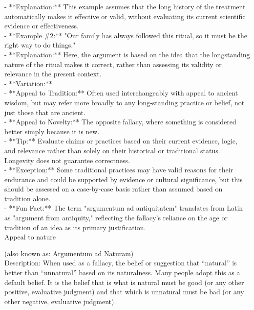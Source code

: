 \documentclass[a4paper,12pt,single,pdftex]{scrartcl}
\begin{document}
    
      - **Explanation:** This example assumes that the long history of the treatment automatically makes it effective or valid, without evaluating its current scientific evidence or effectiveness.
    \\

    
      - **Example \#2:** "Our family has always followed this ritual, so it must be the right way to do things."
    \\

    
      - **Explanation:** Here, the argument is based on the idea that the longstanding nature of the ritual makes it correct, rather than assessing its validity or relevance in the present context.
    \\

    
      - **Variation:**
    \\

    
        - **Appeal to Tradition:** Often used interchangeably with appeal to ancient wisdom, but may refer more broadly to any long-standing practice or belief, not just those that are ancient.
    \\

    
        - **Appeal to Novelty:** The opposite fallacy, where something is considered better simply because it is new.
    \\

    
      - **Tip:** Evaluate claims or practices based on their current evidence, logic, and relevance rather than solely on their historical or traditional status. Longevity does not guarantee correctness.
    \\

    
      - **Exception:** Some traditional practices may have valid reasons for their endurance and could be supported by evidence or cultural significance, but this should be assessed on a case-by-case basis rather than assumed based on tradition alone.
    \\

    
      - **Fun Fact:** The term "argumentum ad antiquitatem" translates from Latin as "argument from antiquity," reflecting the fallacy’s reliance on the age or tradition of an idea as its primary justification.
    \\

  

Appeal to nature
    
      (also known as: Argumentum ad Naturam)
    \\

  
    Description: When used as a fallacy, the belief or suggestion that “natural” is better than “unnatural” based on its naturalness. Many people adopt this as a default belief. It is the belief that is what is natural must be good (or any other positive, evaluative judgment) and that which is unnatural must be bad (or any other negative, evaluative judgment).
\end{document}
